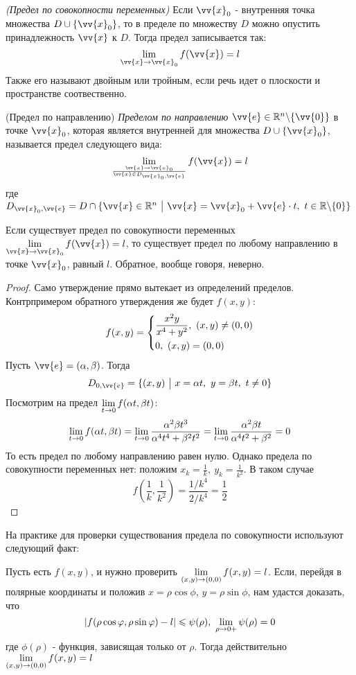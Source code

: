 \begin{definition}
	\textit{(Предел по совокопности переменных)}
	Если $\vv{x}_0$ - внутренняя точка множества $D \cup \{\vv{x}_0\}$, то в пределе по множеству $D$ можно опустить принадлежность $\vv{x}$ к $D$. Тогда предел записывается так:
	\[
		\liml_{\vv{x} \to \vv{x}_0} f(\vv{x}) = l
	\]
	Также его называют двойным или тройным, если речь идет о плоскости и пространстве соотвественно.
\end{definition}
\begin{definition} (Предел по направлению)
	\textit{Пределом по направлению} $\vv{e} \in \R^n \bs \{\vv{0}\}$ в точке $\vv{x}_0$, которая является внутренней для множества $D \cup \{\vv{x}_0\}$, называется предел следующего вида:
	\[
		\liml_{\vv{x} \to \vv{x}_0 \over \vv{x} \in D_{\vv{x}_0, \vv{e}}} f(\vv{x}) = l
	\]
	где	\(
	D_{\vv{x}_0, \vv{e}} = D \cap \{\vv{x} \in \R^n \such \vv{x} = \vv{x}_0 + \vv{e} \cdot t,\ t \in \R \bs \{0\}\}
	\)
\end{definition}

\begin{theorem}
	Если существует предел по совокупности переменных $\liml_{\vv{x} \to \vv{x}_0} f(\vv{x}) = l$, то существует предел по любому направлению в точке $\vv{x}_0$, равный $l$. Обратное, вообще говоря, неверно.
\end{theorem}

\begin{proof}
	Само утверждение прямо вытекает из определений  пределов. Контрпримером обратного утверждения же будет $f(x, y)$:
	\[
		f(x, y) = \left\{\begin{aligned}
			&{\frac{x^2 y}{x^4 + y^2},\ (x, y) \neq (0, 0)}
			\\
			&{0,\ (x, y) = (0, 0)}
		\end{aligned}\right.
	\]
	Пусть $\vv{e} = (\alpha, \beta)$. Тогда
	\[
		D_{0, \vv{e}} = \{(x, y) \such x = \alpha t,\ y = \beta t,\ t \neq 0\}
	\]
	Посмотрим на предел $\lim\limits_{t \to 0} f(\alpha t, \beta t)$:
	\[
		\lim\limits_{t \to 0} f(\alpha t, \beta t) = \lim\limits_{t \to 0} \frac{\alpha^2 \beta t^3}{\alpha^4 t^4 + \beta^2 t^2} = \lim\limits_{t \to 0} \frac{\alpha^2 \beta t}{\alpha^4 t^2 + \beta^2} = 0
	\]
	То есть предел по любому направлению равен нулю. Однако предела по совокупности переменных нет: положим $x_k = \frac{1}{k},\ y_k = \frac{1}{k^2}$. В таком случае
	\[
		f\left(\frac{1}{k}, \frac{1}{k^2}\right) = \frac{1 / k^4}{2 / k^4} = \frac{1}{2}
	\]
\end{proof}

\begin{addition}
	На практике для проверки существования предела по совокупности используют следующий факт:
	
	Пусть есть $f(x, y)$, и нужно проверить $\lim\limits_{(x, y) \to (0, 0)} f(x, y) = l$. Если, перейдя в полярные координаты и положив $x = \rho \cos \phi$, $y = \rho \sin \phi$, нам удастся доказать, что
	\[
		|f(\rho \cos\varphi, \rho \sin\varphi) - l| \leqslant \psi(\rho),\ \lim\limits_{\rho \to 0+} \psi(\rho) = 0
	\]
	где $\phi(\rho)$ - функция, зависящая только от $\rho$. Тогда действительно $\lim\limits_{(x, y) \to (0, 0)} f(x, y) = l$
\end{addition}

